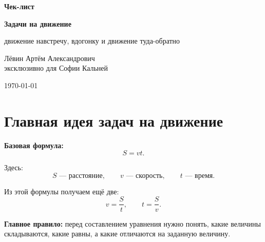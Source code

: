 \documentclass[a4paper,12pt]{article}
\newcommand{\important}[1]{\textcolor{darkaccent}{\textbf{#1}}}
\begin{document}
\begin{titlepage}
\thispagestyle{empty}
\begin{center}
\vspace*{25mm}

{\Large \textcolor{accent}{\textbf{Чек-лист}}}

\vspace{8mm}

{\Huge \textbf{Задачи на движение}}

\vspace{4mm}

{\Large движение навстречу, вдогонку и движение туда-обратно}

\vspace{22mm}

{\large Лёвин Артём Александрович\\[1mm]
эксклюзивно для Софии Кальней}

\vspace{12mm}

{\large \today}

\vfill


\vspace{8mm}
\end{center}
\end{titlepage}

\tableofcontents
\newpage

\section{Главная идея задач на движение}

\important{Базовая формула:}
\[
S = vt.
\]

Здесь:
\[
S \text{ --- расстояние}, \qquad
v \text{ --- скорость}, \qquad
t \text{ --- время}.
\]

Из этой формулы получаем ещё две:
\[
v=\frac{S}{t}, \qquad t=\frac{S}{v}.
\]

\important{Главное правило:} перед составлением уравнения нужно понять, какие величины складываются, какие равны, а какие отличаются на заданную величину.
\end{document}
